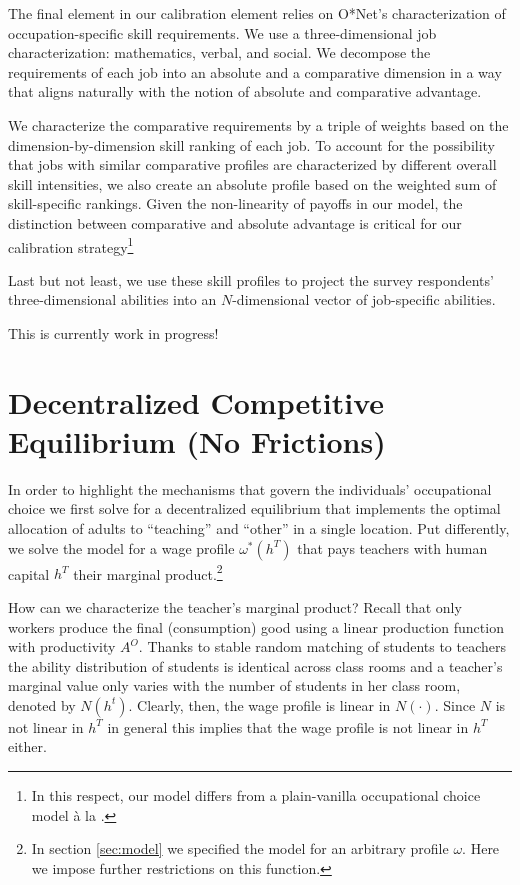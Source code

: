 \documentclass[onehalfspacing,11pt]{article}
\begin{document}
The final element in our calibration element relies on O*Net's characterization of occupation-specific skill requirements. We use a three-dimensional job characterization: mathematics, verbal, and social. We decompose the requirements of each job into an absolute and a comparative dimension in a way that aligns naturally with the notion of absolute and comparative advantage.

We characterize the comparative requirements by a triple of weights based on the dimension-by-dimension skill ranking of each job. To account for the possibility that jobs with similar comparative profiles are characterized by different overall skill intensities, we also create an absolute profile based on the weighted sum of skill-specific rankings. Given the non-linearity of payoffs in our model, the distinction between comparative and absolute advantage is critical for our calibration strategy\footnote{In this respect, our model differs from a plain-vanilla occupational choice model \`a la \cite{Roy:1951}.}

Last but not least, we use these skill profiles to project the survey respondents' three-dimensional abilities into an $N$-dimensional vector of job-specific abilities.

{\sc This is currently work in progress!}

\section{Decentralized Competitive Equilibrium (No Frictions) }\label{sec:firstbest}
In order to highlight the mechanisms that govern the individuals' occupational choice we first solve for a decentralized equilibrium that implements the optimal allocation of adults to ``teaching'' and ``other'' in a single location. Put differently, we solve the model for a wage profile $\omega^*(h^T)$ that pays teachers with human capital $h^T$ their marginal product.\footnote{In section \ref{sec:model} we specified the model for an arbitrary profile $\omega$. Here we impose further restrictions on this function.}

How can we characterize the teacher's marginal product? Recall that only workers produce the final (consumption) good using a linear production function with productivity $A^O$. Thanks to stable random matching of students to teachers the ability distribution of students is identical across class rooms and a teacher's marginal value only varies with the number of students in her class room, denoted by $N(h^t)$. Clearly, then, the wage profile is linear in $N(\cdot)$. Since $N$ is not linear in $h^T$ in general this implies that the wage profile is not linear in $h^T$ either.
\end{document}
